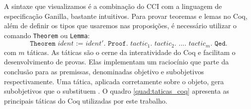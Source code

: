 A sintaxe que visualizamos é a combinação do CCI com a linguagem de especificação Ganilla, bastante intuitivos. Para provar teoremas e lemas no Coq, além de definir os tipos que usaremos nas proposições, é necessário utilizar o comando \texttt{Theorem} ou \texttt{Lemma}: $$\texttt{Theorem $ident$ := $ident'$. Proof. $tactic_1$. $tactic_2$. $...$. $tactic_m$. Qed.}$$ com $m$ táticas. As táticas são o cerne da interatividade do Coq e facilitam o desenvolvimento de provas. Elas implementam um raciocínio que parte da conclusão para as premissas, denominadas objetivo e subobjetivos respectivamente. Uma tática, aplicada corretamente sobre o objeto, gera subobjetivos que o substituem \cite{manualcoq}. O quadro \ref{quad:taticas_coq} apresenta as principais táticas do Coq utilizadas por este trabalho.


